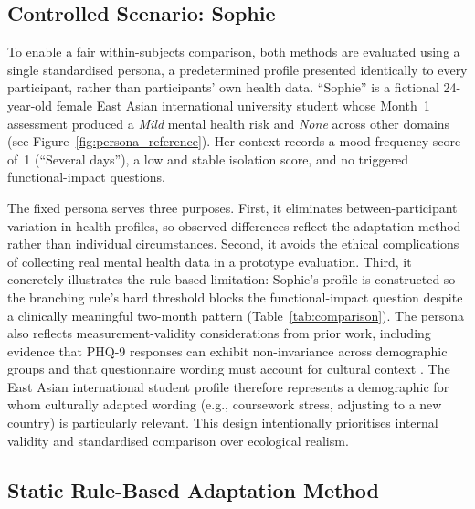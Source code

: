 \documentclass[conference]{IEEEtran}
\begin{document}
\subsection{Controlled Scenario: Sophie}
\label{subsec:sophie}

To enable a fair within-subjects comparison, both methods are evaluated
using a single standardised persona, a predetermined profile presented
identically to every participant, rather than participants' own health
data. ``Sophie'' is a fictional 24-year-old female East Asian
international university student whose Month~1 assessment produced a
\emph{Mild} mental health risk and \emph{None} across other domains
(see Figure~\ref{fig:persona_reference}). Her context records a
mood-frequency score of~1 (``Several days''), a low and stable isolation
score, and no triggered functional-impact questions.

The fixed persona serves three purposes. First, it eliminates
between-participant variation in health profiles, so observed
differences reflect the adaptation method rather than individual
circumstances. Second, it avoids the ethical complications of
collecting real mental health data in a prototype evaluation. Third, it
concretely illustrates the rule-based limitation: Sophie's profile is
constructed so the branching rule's hard threshold blocks the
functional-impact question despite a clinically meaningful two-month
pattern (Table~\ref{tab:comparison}). The persona also reflects
measurement-validity considerations from prior work, including evidence
that PHQ-9 responses can exhibit non-invariance across demographic groups
\cite{baas2011} and that questionnaire wording must account for cultural
context \cite{wild2005}. The East Asian international student profile
therefore represents a demographic for whom culturally adapted wording
(e.g., coursework stress, adjusting to a new country) is particularly relevant.
This design intentionally prioritises internal validity and standardised
comparison over ecological realism.

\subsection{Static Rule-Based Adaptation Method}
\label{subsec:rule_based}
\end{document}
